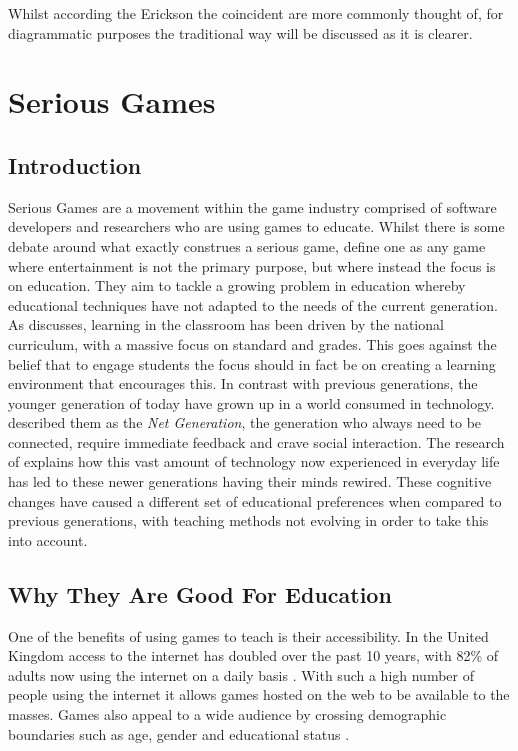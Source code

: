 \documentclass[12pt,a4paper]{report}
\begin{document}
Whilst according the Erickson the coincident are more commonly thought of, for diagrammatic purposes the traditional way will be discussed as it is clearer. 



\chapter{Serious Games}
\section{Introduction}
Serious Games are a movement within the game industry comprised of software developers and researchers who are using games to educate. Whilst there is some debate around what exactly construes a serious game, \cite{michael2005serious} define one as any game where entertainment is not the primary purpose, but where instead the focus is on education. They aim to tackle a growing problem in education whereby educational techniques have not adapted to the needs of the current generation. As \citep{Lim} discusses, learning in the classroom has been driven by the national curriculum, with a massive focus on standard and grades. This goes against the belief that to engage students the focus should in fact be on creating a learning environment that encourages this.  In contrast with previous generations, the younger generation of today have grown up in a world consumed in technology. \cite{oblinger2005educating} described them as the \textit{Net Generation}, the generation who always need to be connected, require immediate feedback and crave social interaction. The research of \cite{prensky2001games} explains how this vast amount of technology now experienced in everyday life has led to these newer generations having their minds rewired. These cognitive changes have caused a different set of educational preferences when compared to previous generations, with teaching methods not evolving in order to take this into account.

\section{Why They Are Good For Education}
One of the benefits of using games to teach is their accessibility. In the United Kingdom  access to the internet has doubled over the past 10 years, with 82\% of adults now using the internet on a daily basis \citep{onssurvey}. With such a high number of people using the internet it allows games hosted on the web to be available to the masses. Games also appeal to a wide audience by crossing demographic boundaries such as age, gender and educational status \citep{griffiths2002educational}. 
\end{document}
